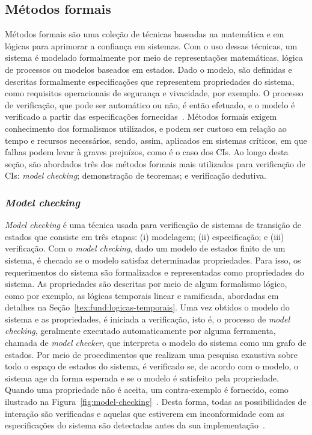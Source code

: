 
\subsection{Métodos formais} \label{tex:fund:metodos-formais}

Métodos formais são uma coleção de técnicas baseadas na matemática e em lógicas para aprimorar a confiança em sistemas. Com o uso dessas técnicas, um sistema é modelado formalmente por meio de representações matemáticas, lógica de processos ou modelos baseados em estados. Dado o modelo, são definidas e descritas formalmente especificações que representem propriedades do sistema, como requisitos operacionais de segurança e vivacidade, por exemplo. O processo de verificação, que pode ser automático ou não, é então efetuado, e o modelo é verificado a partir das especificações fornecidas~\cite{peled2019formal-methods}. Métodos formais exigem conhecimento dos formalismos utilizados, e podem ser custoso em relação ao tempo e recursos necessários, sendo, assim, aplicados em sistemas críticos, em que falhas podem levar à graves prejuízos, como é o caso dos CIs. Ao longo desta seção, são abordados três dos métodos formais mais utilizados para verificação de CIs: \textit{model checking}; demonstração de teoremas; e verificação dedutiva.

\subsubsection*{\textbf{\textit{Model checking}}}

\textit{Model checking} é uma técnica usada para verificação de sistemas de transição de estados que consiste em três etapas: (i) modelagem; (ii) especificação; e (iii) verificação. Com o \textit{model checking}, dado um modelo de estados finito de um sistema, é checado se o modelo satisfaz determinadas propriedades. Para isso, os requerimentos do sistema são formalizados e representadas como propriedades do sistema. As propriedades são descritas por meio de algum formalismo lógico, como por exemplo, as lógicas temporais linear e ramificada, abordadas em detalhes na Seção~\ref{tex:fund:logicas-temporais}. Uma vez obtidos o modelo do sistema e as propriedades, é iniciada a verificação, isto é, o processo de \textit{model checking}, geralmente executado automaticamente por alguma ferramenta, chamada de \textit{model checker}, que interpreta o modelo do sistema como um grafo de estados. Por meio de procedimentos que realizam uma pesquisa exaustiva sobre todo o espaço de
estados do sistema, é verificado se, de acordo com o modelo, o sistema age da forma esperada e se o modelo é satisfeito pela propriedade. Quando uma propriedade não é aceita, um contra-exemplo é fornecido, como ilustrado na Figura~\ref{fig:model-checking}~\cite{clarke2018model}. Desta forma, todas as possibilidades de interação são verificadas e aquelas que estiverem em inconformidade com as especificações do sistema são detectadas antes da sua implementação~\cite{peled2019formal-methods}.

